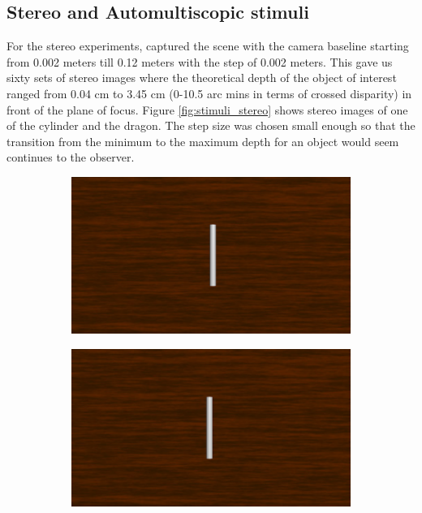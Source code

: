\subsection{Stereo and Automultiscopic stimuli}
For the stereo experiments, captured the scene with the camera baseline starting from 0.002 meters till 0.12 meters with the step of 0.002 meters. This gave us sixty sets of stereo images where the theoretical depth of the object of interest ranged from 0.04 cm to 3.45 cm (0-10.5 arc mins in terms of crossed disparity) in front of the plane of focus. Figure \ref{fig:stimuli_stereo} shows stereo images of one of the cylinder and the dragon. The step size was chosen small enough so that the transition from the minimum to the maximum depth for an object would seem continues to the observer.
\begin{figure}[htbp]
    \begin{subfigure}[b]{0.5\textwidth}
        \includegraphics[width=\textwidth]{./Template_Figures/57L.png}
        \caption{}\label{fig:left_stereo_cyl}
    \end{subfigure}
    \begin{subfigure}[b]{0.5\textwidth}
        \includegraphics[width=\textwidth]{./Template_Figures/57R}
        \caption{}\label{fig:right_stereo_cyl}
    \end{subfigure}


\end{figure}
